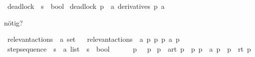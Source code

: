 \begin{isabellebody}
\ deadlock\ {\isacharcolon}{\kern0pt}{\isacharcolon}{\kern0pt}\ {\isacartoucheopen}{\isacharprime}{\kern0pt}s\ {\isasymRightarrow}\ bool{\isacartoucheclose}\ \isanewline
{\isacartoucheopen}deadlock\ p\ {\isasymequiv}\ {\isacharparenleft}{\kern0pt}{\isasymforall}a{\isachardot}{\kern0pt}\ derivatives\ p\ a\ {\isacharequal}{\kern0pt}\ {\isacharbraceleft}{\kern0pt}{\isacharbraceright}{\kern0pt}{\isacharparenright}{\kern0pt}{\isacartoucheclose}%
\begin{isamarkuptext}%
nötig?%
\end{isamarkuptext}\isamarkuptrue%
\isamarkupfalse%
\ relevant{\isacharunderscore}{\kern0pt}actions\ {\isacharcolon}{\kern0pt}{\isacharcolon}{\kern0pt}\ {\isacartoucheopen}{\isacharprime}{\kern0pt}a\ set{\isacartoucheclose}\isanewline
\ \ \isanewline
{\isacartoucheopen}relevant{\isacharunderscore}{\kern0pt}actions\ {\isasymequiv}\ {\isacharbraceleft}{\kern0pt}a{\isachardot}{\kern0pt}\ {\isasymexists}p\ p{\isacharprime}{\kern0pt}{\isachardot}{\kern0pt}\ p\ {\isasymmapsto}a\ p{\isacharprime}{\kern0pt}{\isacharbraceright}{\kern0pt}{\isacartoucheclose}\isanewline
\isanewline
{}\isamarkupfalse%
\ step{\isacharunderscore}{\kern0pt}sequence\ {\isacharcolon}{\kern0pt}{\isacharcolon}{\kern0pt}\ {\isacartoucheopen}{\isacharprime}{\kern0pt}s\ {\isasymRightarrow}\ {\isacharprime}{\kern0pt}a\ list\ {\isasymRightarrow}\ {\isacharprime}{\kern0pt}s\ {\isasymRightarrow}\ bool{\isacartoucheclose}\ {\isacharparenleft}{\kern0pt}{\isacartoucheopen}{\isacharunderscore}{\kern0pt}\ {\isasymmapsto}{\isachardollar}{\kern0pt}\ {\isacharunderscore}{\kern0pt}\ {\isacharunderscore}{\kern0pt}{\isacartoucheclose}{\isacharbrackleft}{\kern0pt}{}{}{\isacharcomma}{\kern0pt}{}{}{\isacharcomma}{\kern0pt}{}{}{\isacharbrackright}{\kern0pt}\ {}{}{\isacharparenright}{\kern0pt}\ \isanewline
{\isacartoucheopen}p\ {\isasymmapsto}{\isachardollar}{\kern0pt}\ {\isacharbrackleft}{\kern0pt}{\isacharbrackright}{\kern0pt}\ p{\isacartoucheclose}\ {\isacharbar}{\kern0pt}\isanewline
{\isacartoucheopen}p\ {\isasymmapsto}{\isachardollar}{\kern0pt}\ {\isacharparenleft}{\kern0pt}a{\isacharhash}{\kern0pt}rt{\isacharparenright}{\kern0pt}\ p{\isacharprime}{\kern0pt}{\isacharprime}{\kern0pt}{\isacartoucheclose}\ \ {\isacartoucheopen}{\isasymexists}p{\isacharprime}{\kern0pt}{\isachardot}{\kern0pt}\ p\ {\isasymmapsto}\ a\ p{\isacharprime}{\kern0pt}\ {\isasymand}\ p{\isacharprime}{\kern0pt}\ {\isasymmapsto}{\isachardollar}{\kern0pt}\ rt\ p{\isacharprime}{\kern0pt}{\isacharprime}{\kern0pt}{\isacartoucheclose}%

\end{isabellebody}
